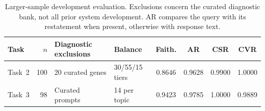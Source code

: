 \begin{table}
  \centering
  \scriptsize
  \caption{Larger-sample development evaluation. Exclusions concern the curated diagnostic bank, not all prior system development. AR compares the query with its restatement when present, otherwise with response text.}
  \label{tab:large-sample-robustness}
  \setlength{\tabcolsep}{3pt}
  \begin{tabular}{l r l l c c c c}
    \toprule
    Task & $n$ & Diagnostic exclusions & Balance & Faith. & AR & CSR & CVR \\
    \midrule
    Task~2 & 100 & 20 curated genes & 30/55/15 tiers & 0.8646 & 0.9628 & 0.9900 & 1.0000 \\
    Task~3 & 98 & Curated prompts & 14 per topic & 0.9423 & 0.9785 & 1.0000 & 0.9889 \\
    \bottomrule
  \end{tabular}
\end{table}
